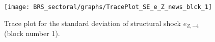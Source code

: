 \begin{figure}[H]
\centering
  \texttt{[image: BRS\_sectoral/graphs/TracePlot\_SE\_e\_Z\_news\_blck\_1]}\\
    \caption{Trace plot for the standard deviation of structural shock ${e_{Z,-4}}$ (block number 1).}
\end{figure}

